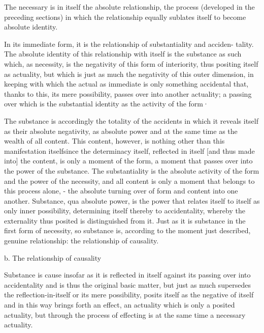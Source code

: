 {The necessary is in itself the absolute relationship,
the process (developed in the preceding sections) in which
the relationship equally sublates itself to become absolute identity.

In its immediate form, it is the relationship of substantiality and acciden-
tality. The absolute identity of this relationship with itself is the substance
as such which, as necessity, is the negativity of this form of interiority, thus
positing itself as actuality, but which is just as much the negativity of this
outer dimension, in keeping with which the actual as immediate is only
something accidental that, thanks to this, its mere possibility, passes over
into another actuality; a passing over which is the substantial identity as the
activity of the form·

The substance is accordingly the totality of the accidents in which it reveals
itself as their absolute negativity, as absolute power and at the same time
as the wealth of all content. This content, however, is nothing other than
this manifestation itselfsince the determinacy itself, reflected in itself [and
thus made into] the content, is only a moment of the form, a moment
that passes over into the power of the substance. The substantiality is the
absolute activity of the form and the power of the necessity, and all content
is only a moment that belongs to this process alone, - the absolute turning
over of form and content into one another.
Substance, qua absolute power, is the power that
relates itself to itself as only inner possibility,
determining itself thereby to accidentality,
whereby the externality thus posited is distinguished from it.
Just as it is substance in the first form of necessity,
so substance is, according to the moment just described,
genuine relationship: the relationship of causality.

b. The relationship of causality

Substance is cause insofar as it is reflected in itself
against its passing over into accidentality and
is thus the original basic matter,
but just as much supersedes the reflection-in-itself
or its mere possibility,
posits itself as the negative of itself and
in this way brings forth an effect,
an actuality which is only a posited actuality,
but through the process of effecting is
at the same time a necessary actuality.

}
